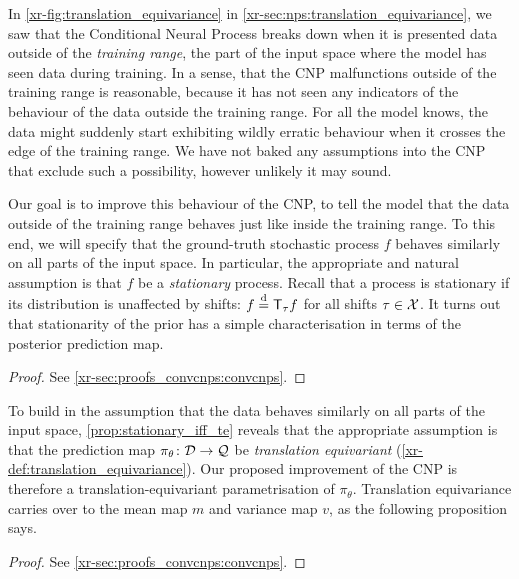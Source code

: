 \documentclass[12pt]{report}
\newcommand{\xrprefix}[1]{xr-#1}
\begin{document}
In \cref{\xrprefix{fig:translation_equivariance}} in \cref{\xrprefix{sec:nps:translation_equivariance}},
we saw that the Conditional Neural Process breaks down when it is presented data outside of the \emph{training range}, the part of the input space where the model has seen data during training.
In a sense, that the CNP malfunctions outside of the training range is reasonable,
because it has not seen any indicators of the behaviour of the data outside the training range.
For all the model knows, the data might suddenly start exhibiting wildly erratic behaviour when it crosses the edge of the training range.
We have not baked any assumptions into the CNP that exclude such a possibility, however unlikely it may sound.

Our goal is to improve this behaviour of the CNP, to tell the model that the data outside of the training range behaves just like inside the training range.
To this end, we will specify that the ground-truth stochastic process $f$ behaves similarly on all parts of the input space.
In particular, the appropriate and natural assumption is that $f$ be a \emph{stationary} process.
Recall that a process is stationary if its distribution is unaffected by shifts: $f \disteq \T_\tau f$ for all shifts $\tau \in \mathcal{X}$.
It turns out that stationarity of the prior has a simple characterisation in terms of the posterior prediction map.

\begin{proof}
    See \cref{\xrprefix{sec:proofs_convcnps:convcnps}}.
\end{proof}

To build in the assumption that the data behaves similarly on all parts of the input space, \cref{prop:stationary_iff_te} reveals that the appropriate assumption is that the prediction map $\pi_\theta \colon \mathcal{D} \to \mathcal{Q}$ be \emph{translation equivariant} (\cref{\xrprefix{def:translation_equivariance}}).
Our proposed improvement of the CNP is therefore a translation-equivariant parametrisation of $\pi_\theta$.
Translation equivariance carries over to the mean map $m$ and variance map $v$, as the following proposition says.

\begin{proof}
    See \cref{\xrprefix{sec:proofs_convcnps:convcnps}}.   
\end{proof}
\end{document}
